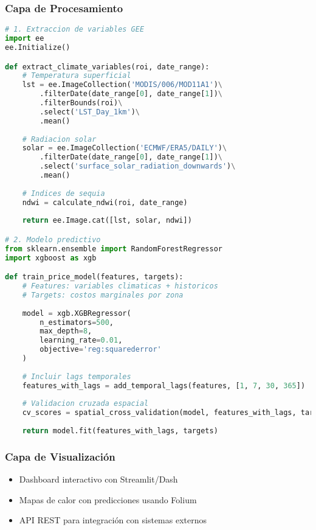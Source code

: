 \documentclass[12pt,a4paper]{article}
\begin{document}
\subsubsection{Capa de Procesamiento}
\begin{lstlisting}[language=Python, caption=Pipeline de procesamiento propuesto]
# 1. Extraccion de variables GEE
import ee
ee.Initialize()

def extract_climate_variables(roi, date_range):
    # Temperatura superficial
    lst = ee.ImageCollection('MODIS/006/MOD11A1')\
        .filterDate(date_range[0], date_range[1])\
        .filterBounds(roi)\
        .select('LST_Day_1km')\
        .mean()
    
    # Radiacion solar
    solar = ee.ImageCollection('ECMWF/ERA5/DAILY')\
        .filterDate(date_range[0], date_range[1])\
        .select('surface_solar_radiation_downwards')\
        .mean()
    
    # Indices de sequia
    ndwi = calculate_ndwi(roi, date_range)
    
    return ee.Image.cat([lst, solar, ndwi])

# 2. Modelo predictivo
from sklearn.ensemble import RandomForestRegressor
import xgboost as xgb

def train_price_model(features, targets):
    # Features: variables climaticas + historicos
    # Targets: costos marginales por zona
    
    model = xgb.XGBRegressor(
        n_estimators=500,
        max_depth=8,
        learning_rate=0.01,
        objective='reg:squarederror'
    )
    
    # Incluir lags temporales
    features_with_lags = add_temporal_lags(features, [1, 7, 30, 365])
    
    # Validacion cruzada espacial
    cv_scores = spatial_cross_validation(model, features_with_lags, targets)
    
    return model.fit(features_with_lags, targets)
\end{lstlisting}

\subsubsection{Capa de Visualización}
\begin{itemize}
    \item Dashboard interactivo con Streamlit/Dash
    \item Mapas de calor con predicciones usando Folium
    \item API REST para integración con sistemas externos
\end{itemize}
\end{document}
